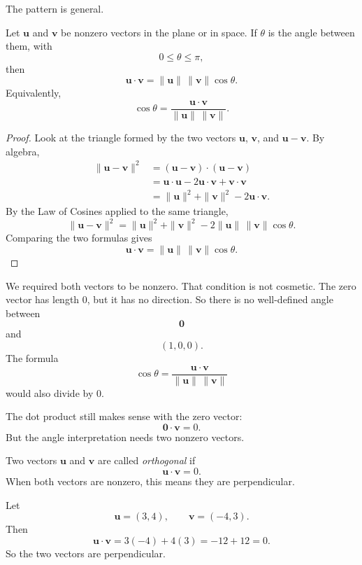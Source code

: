 The pattern is general.

\begin{theorem}
Let \(\mathbf u\) and \(\mathbf v\) be nonzero vectors in the plane or in space.  If
\(\theta\) is the angle between them, with
\[
    0\leq \theta\leq \pi,
\]
then
\[
\boxed{
    \mathbf u\cdot\mathbf v
    =
    \|\mathbf u\|\,\|\mathbf v\|\cos\theta.
}
\]
Equivalently,
\[
    \cos\theta
    =
    \frac{\mathbf u\cdot\mathbf v}{\|\mathbf u\|\,\|\mathbf v\|}.
\]
\end{theorem}

\begin{proof}
Look at the triangle formed by the two vectors \(\mathbf u\), \(\mathbf v\), and
\(\mathbf u-\mathbf v\).  By algebra,
\[
\begin{aligned}
\|\mathbf u-\mathbf v\|^2
&=
(\mathbf u-\mathbf v)\cdot(\mathbf u-\mathbf v)\\
&=
\mathbf u\cdot\mathbf u
-2\mathbf u\cdot\mathbf v
+\mathbf v\cdot\mathbf v\\
&=
\|\mathbf u\|^2+\|\mathbf v\|^2-2\mathbf u\cdot\mathbf v.
\end{aligned}
\]
By the Law of Cosines applied to the same triangle,
\[
    \|\mathbf u-\mathbf v\|^2
    =
    \|\mathbf u\|^2+\|\mathbf v\|^2
    -2\|\mathbf u\|\,\|\mathbf v\|\cos\theta.
\]
Comparing the two formulas gives
\[
    \mathbf u\cdot\mathbf v
    =
    \|\mathbf u\|\,\|\mathbf v\|\cos\theta.
\]
\end{proof}

We required both vectors to be nonzero.  That condition is not cosmetic.  The zero
vector has length \(0\), but it has no direction.  So there is no well-defined angle
between
\[
    \mathbf 0
\]
and
\[
    (1,0,0).
\]
The formula
\[
    \cos\theta
    =
    \frac{\mathbf u\cdot\mathbf v}{\|\mathbf u\|\,\|\mathbf v\|}
\]
would also divide by \(0\).

The dot product still makes sense with the zero vector:
\[
    \mathbf 0\cdot\mathbf v=0.
\]
But the angle interpretation needs two nonzero vectors.

\begin{definition}
Two vectors \(\mathbf u\) and \(\mathbf v\) are called \emph{orthogonal} if
\[
    \mathbf u\cdot\mathbf v=0.
\]
When both vectors are nonzero, this means they are perpendicular.
\end{definition}

\begin{example}
Let
\[
    \mathbf u=(3,4),
    \qquad
    \mathbf v=(-4,3).
\]
Then
\[
    \mathbf u\cdot\mathbf v
    =
    3(-4)+4(3)
    =
    -12+12
    =
    0.
\]
So the two vectors are perpendicular.
\end{example}

